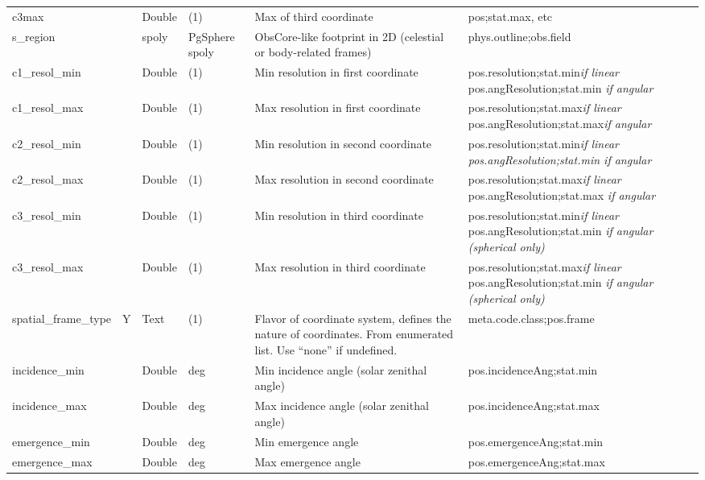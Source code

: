 \documentclass[11pt,a4paper]{ivoa}
\begin{document}
\begin{longtable}{p{3.5cm}p{0.5cm}p{1cm}p{1cm}p{7cm}p{3cm}}
c3max&&Double&(1)&Max of third coordinate&pos;stat.max, etc\\

s\_region&&spoly&PgSphere spoly&ObsCore-like footprint in 2D (celestial or body-related frames)&phys.outline;obs.field\\

c1\_resol\_min&&Double&(1)&Min resolution in first coordinate&pos.resolution;stat.min\emph{\emph{\emph{if linear} }}pos.angResolution;stat.min \emph{if angular}\\

c1\_resol\_max&&Double&(1)&Max resolution in first coordinate&pos.resolution;stat.max\emph{\emph{\emph{if linear} }}pos.angResolution;stat.max\emph{if angular}\\

c2\_resol\_min&&Double&(1)&Min resolution in second coordinate&pos.resolution;stat.min\emph{\emph{if linear} }\emph{pos.angResolution;stat.min \emph{if angular}}\\

c2\_resol\_max&&Double&(1)&Max resolution in second coordinate&pos.resolution;stat.max\emph{if linear} pos.angResolution;stat.max \emph{\emph{if angular}}\\

c3\_resol\_min&&Double&(1)&Min resolution in third coordinate&pos.resolution;stat.min\emph{if linear} pos.angResolution;stat.min \emph{if angular (spherical only)}\\

c3\_resol\_max&&Double&(1)&Max resolution in third coordinate&pos.resolution;stat.max\emph{if linear}  pos.angResolution;stat.min \emph{\emph{if angular (spherical only)} }\\

spatial\_frame\_type& Y&Text&(1)&Flavor of coordinate system, defines the nature of coordinates. From enumerated list. Use ``none'' if undefined.&meta.code.class;pos.frame\\

incidence\_min&&Double&deg&Min incidence angle (solar zenithal angle)& pos.incidenceAng;stat.min \\

incidence\_max&&Double&deg&Max incidence angle (solar zenithal angle)& pos.incidenceAng;stat.max \\

emergence\_min&&Double&deg&Min emergence angle& pos.emergenceAng;stat.min \\

emergence\_max&&Double&deg&Max emergence angle& pos.emergenceAng;stat.max\\


\end{longtable}
\end{document}

